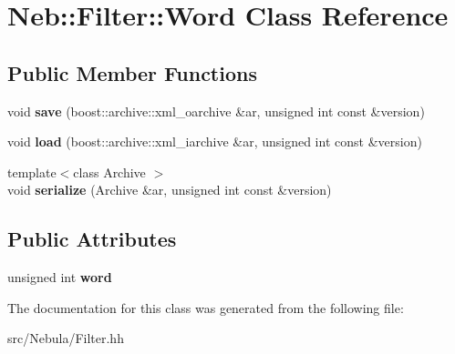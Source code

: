 \hypertarget{classNeb_1_1Filter_1_1Word}{\section{\-Neb\-:\-:\-Filter\-:\-:\-Word \-Class \-Reference}
\label{classNeb_1_1Filter_1_1Word}
}
\subsection*{\-Public \-Member \-Functions}
\begin{DoxyCompactItemize}
\item 
\hypertarget{classNeb_1_1Filter_1_1Word_a68ed4376e2575296ce033bcecfc1ba7c}{void {\bfseries save} (boost\-::archive\-::xml\-\_\-oarchive \&ar, unsigned int const \&version)}\label{classNeb_1_1Filter_1_1Word_a68ed4376e2575296ce033bcecfc1ba7c}

\item 
\hypertarget{classNeb_1_1Filter_1_1Word_a6f275867b6bf60faf934cff9ff3daadf}{void {\bfseries load} (boost\-::archive\-::xml\-\_\-iarchive \&ar, unsigned int const \&version)}\label{classNeb_1_1Filter_1_1Word_a6f275867b6bf60faf934cff9ff3daadf}

\item 
\hypertarget{classNeb_1_1Filter_1_1Word_a00a33a481c53a9280b9f8c4e408e8ad2}{{\footnotesize template$<$class Archive $>$ }\\void {\bfseries serialize} (\-Archive \&ar, unsigned int const \&version)}\label{classNeb_1_1Filter_1_1Word_a00a33a481c53a9280b9f8c4e408e8ad2}

\end{DoxyCompactItemize}
\subsection*{\-Public \-Attributes}
\begin{DoxyCompactItemize}
\item 
\hypertarget{classNeb_1_1Filter_1_1Word_a6ccc8350b1c59e2dcc3f81fec23f709c}{unsigned int {\bfseries word}}\label{classNeb_1_1Filter_1_1Word_a6ccc8350b1c59e2dcc3f81fec23f709c}

\end{DoxyCompactItemize}


\-The documentation for this class was generated from the following file\-:\begin{DoxyCompactItemize}
\item 
src/\-Nebula/\-Filter.\-hh\end{DoxyCompactItemize}
